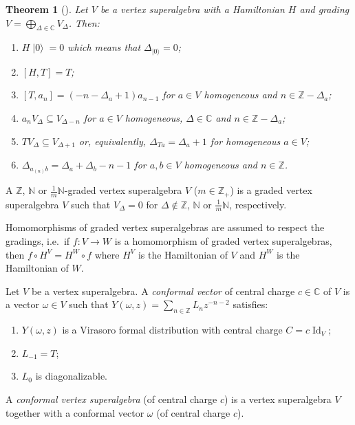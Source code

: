 \documentclass[a4paper, 12pt, reqno]{amsart}
\newtheorem{theorem}{Theorem}[section]
\theoremstyle{remark}
\numberwithin{equation}{subsection}
\DeclareMathOperator{\Id}{Id}
\DeclareMathOperator{\vac}{|0\rangle}
\begin{document}
\begin{theorem}[{\cite[\S4.9]{kac_vertex_1998}}]
  \label{thr:20}
  Let $V$ be a vertex superalgebra with a Hamiltonian $H$ and grading $V = \bigoplus_{\Delta \in \mathbb{C}}V_{\Delta}$.
  Then:
  \begin{enumerate}
  \item $H\vac = 0$ which means that $\Delta_{\vac} = 0$;
  \item $[H, T] = T$;
  \item $[T, a_n] = (-n - \Delta_a + 1)a_{n - 1}$ for $a \in V$ homogeneous and $n \in \mathbb{Z} - \Delta_a$;
  \item $a_nV_{\Delta} \subseteq V_{\Delta - n}$ for $a \in V$ homogeneous, $\Delta \in \mathbb{C}$ and $n \in \mathbb{Z} - \Delta_a$;
  \item $TV_\Delta \subseteq V_{\Delta + 1}$ or, equivalently, $\Delta_{Ta} = \Delta_a + 1$ for homogeneous $a \in V$;
  \item $\Delta_{a_{(n)}b} = \Delta_a + \Delta_b - n - 1$ for $a, b \in V$ homogeneous and $n \in \mathbb{Z}$.
  \end{enumerate}
\end{theorem}

A $\mathbb{Z}$, $\mathbb{N}$ or $\frac{1}{m}\mathbb{N}$-graded vertex superalgebra $V$ ($m \in \mathbb{Z}_+$) is a graded vertex superalgebra $V$ such that $V_{\Delta} = 0$ for $\Delta \notin \mathbb{Z}$, $\mathbb{N}$ or $\frac{1}{m}\mathbb{N}$, respectively.

Homomorphisms of graded vertex superalgebras are assumed to respect the gradings, i.e.\ if $f: V \to W$ is a homomorphism of graded vertex superalgebras, then $f\circ H^V = H^W\circ f$ where $H^V$ is the Hamiltonian of $V$ and $H^W$ is the Hamiltonian of $W$.

Let $V$ be a vertex superalgebra.
A \emph{conformal vector} of central charge $c \in \mathbb{C}$ of $V$ is a vector $\omega \in V$ such that $Y(\omega, z) = \sum_{n \in \mathbb{Z}}L_nz^{-n - 2}$ satisfies:
\begin{enumerate}
\item $Y(\omega, z)$ is a Virasoro formal distribution with central charge $C = c\Id_V$;
\item $L_{-1} = T$;
\item $L_0$ is diagonalizable.
\end{enumerate}

A \emph{conformal vertex superalgebra} (of central charge $c$) is a vertex superalgebra $V$ together with a conformal vector $\omega$ (of central charge $c$).
\end{document}
